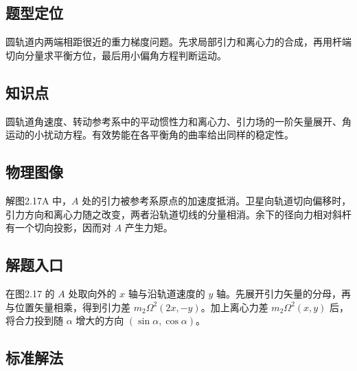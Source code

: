 \documentclass[UTF8,fontset=fandol,a4paper,11pt]{ctexart}
\begin{document}


\subsection*{题型定位}

圆轨道内两端相距很近的重力梯度问题。先求局部引力和离心力的合成，再用杆端切向分量求平衡方位，最后用小偏角方程判断运动。



\subsection*{知识点}

圆轨道角速度、转动参考系中的平动惯性力和离心力、引力场的一阶矢量展开、角运动的小扰动方程。有效势能在各平衡角的曲率给出同样的稳定性。




\subsection*{物理图像}

解图2.17A 中，$A$ 处的引力被参考系原点的加速度抵消。卫星向轨道切向偏移时，引力方向和离心力随之改变，两者沿轨道切线的分量相消。余下的径向力相对斜杆有一个切向投影，因而对 $A$ 产生力矩。



\subsection*{解题入口}

在图2.17 的 $A$ 处取向外的 $x$ 轴与沿轨道速度的 $y$ 轴。先展开引力矢量的分母，再与位置矢量相乘，得到引力差 $m_2\Omega^2(2x,-y)$。加上离心力差 $m_2\Omega^2(x,y)$ 后，将合力投到随 $\alpha$ 增大的方向 $(\sin\alpha,\cos\alpha)$。



\subsection*{标准解法}
\end{document}
